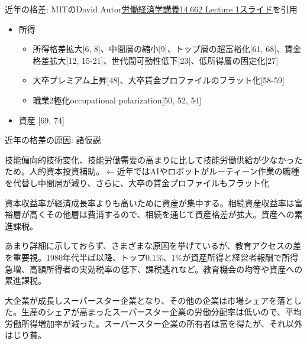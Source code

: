\begin{frame}[label=InequalityInTwoSense]{}
近年の格差: MITのDavid Autor\href{https://economics.mit.edu/people/faculty/david-h-autor/courses}{労働経済学講義14.662 Lecture 1スライド}を引用
\begin{itemize}
\vspace{1.0ex}\setlength{\itemsep}{3.0ex}\setlength{\baselineskip}{12pt}
\item	所得
	\begin{itemize}
	\vspace{1.0ex}\setlength{\itemsep}{1.0ex}\setlength{\baselineskip}{12pt}
	\item	所得格差拡大[6, 8]、中間層の縮小[9]、トップ層の超富裕化[61, 68]、賃金格差拡大[12, 15-21]、世代間可動性低下[23]、低所得層の固定化[27]
	\item	大卒プレミアム上昇[48]、大卒賃金プロファイルのフラット化[58-59]
	\item	職業2極化occupational polarization[50, 52, 54]
	\end{itemize}
\item	資産 [69, 74]
\end{itemize}

\end{frame}
\begin{frame}[label=InequalityHypothesises]{}
近年の格差の原因: 諸仮説
\begin{description}
\vspace{1.0ex}\setlength{\itemsep}{1.0ex}\setlength{\baselineskip}{12pt}
\pause
\item[技能労働需給]		技能偏向的技術変化、技能労働需要の高まりに比して技能労働供給が少なかったため\citep{KatzMurphy1992, GoldinKatz2009}。人的資本投資補助。$\leftarrow$近年ではAIやロボットがルーティーン作業の職種を代替し中間層が減り、さらに、大卒の賃金プロファイルもフラット化
\pause
\item[資本収益率が高い]	資本収益率が経済成長率よりも高いために資産が集中する\citep{Piketty2014}。相続資産収益率は富裕層が高くその他層は費消するので、相続を通じて資産格差が拡大\citep{NekoeiSeim2022}。資産への累進課税。
\pause
\item[階級的特権]	あまり詳細に示しておらず、さまざまな原因を挙げているが、教育アクセスの差を重要視\citep{Piketty2014}。1980年代半ば以降、トップ0.1\%、1\%が資産所得と経営者報酬で所得急増、高額所得者の実効税率の低下、課税逃れなど\citep{PikettySaez2014,PikettySaezZucman2018}。教育機会の均等や資産への累進課税。
\pause
\item[スーパースター企業の成長]	大企業が成長しスーパースター企業となり、その他の企業は市場シェアを落とした。生産のシェアが高まったスーパースター企業の労働分配率は低いので、平均労働所得増加率が減った\citep{ADKPV2020}。スーパースター企業の所有者は富を得たが、それ以外はじり貧。
\end{description}
\end{frame}



